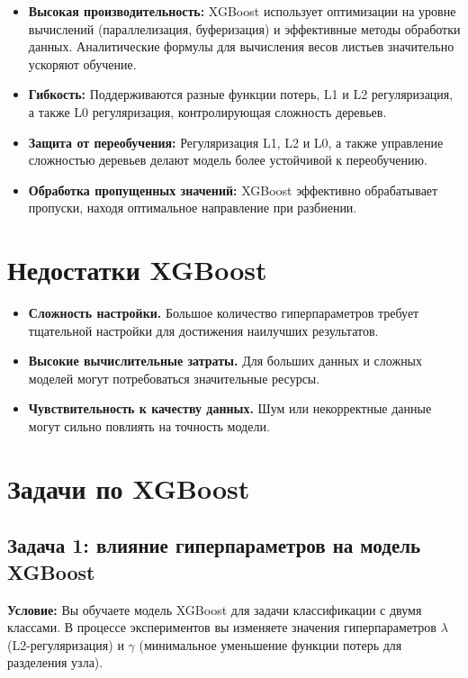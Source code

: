 \begin{itemize}
    \item \textbf{Высокая производительность:}  XGBoost использует оптимизации на уровне вычислений (параллелизация, буферизация) и эффективные методы обработки данных. Аналитические формулы для вычисления весов листьев значительно ускоряют обучение.
    \item \textbf{Гибкость:} Поддерживаются разные функции потерь, L1 и L2 регуляризация, а также L0 регуляризация, контролирующая сложность деревьев.
    \item \textbf{Защита от переобучения:}  Регуляризация L1, L2 и L0, а также управление сложностью деревьев делают модель более устойчивой к переобучению.
    \item \textbf{Обработка пропущенных значений:} XGBoost эффективно обрабатывает пропуски, находя оптимальное направление при разбиении.
\end{itemize}

\section*{Недостатки XGBoost}

\begin{itemize}
    \item \textbf{Сложность настройки.} Большое количество гиперпараметров требует тщательной настройки для достижения наилучших результатов.
    \item \textbf{Высокие вычислительные затраты.} Для больших данных и сложных моделей могут потребоваться значительные ресурсы.
    \item \textbf{Чувствительность к качеству данных.} Шум или некорректные данные могут сильно повлиять на точность модели.
\end{itemize}

\newpage
\section*{Задачи по XGBoost}

\subsection*{Задача 1: влияние гиперпараметров на модель XGBoost}
\textbf{Условие:} Вы обучаете модель XGBoost для задачи классификации с двумя классами. В процессе экспериментов вы изменяете значения гиперпараметров $\lambda$ (L2-регуляризация) и $\gamma$ (минимальное уменьшение функции потерь для разделения узла).


